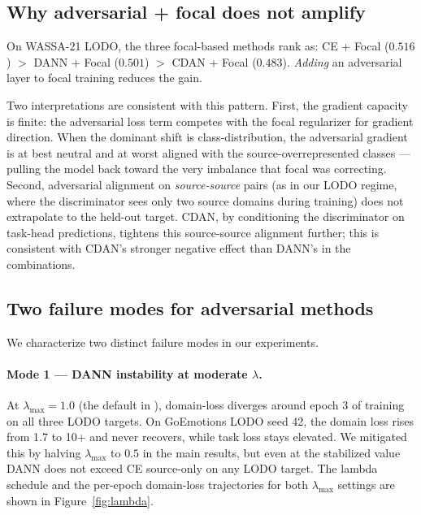 \subsection{Why adversarial + focal does not amplify}
\label{sec:discussion:combinations}

On WASSA-21 LODO, the three focal-based methods rank as: CE + Focal
($0.516$) $>$ DANN + Focal ($0.501$) $>$ CDAN + Focal ($0.483$).
\emph{Adding} an adversarial layer to focal training reduces the
gain.

Two interpretations are consistent with this pattern. First, the
gradient capacity is finite: the adversarial loss term competes with
the focal regularizer for gradient direction. When the dominant
shift is class-distribution, the adversarial gradient is at best
neutral and at worst aligned with the source-overrepresented
classes — pulling the model back toward the very imbalance that
focal was correcting. Second, adversarial alignment on
\emph{source-source} pairs (as in our LODO regime, where the
discriminator sees only two source domains during training) does not
extrapolate to the held-out target. CDAN, by conditioning the
discriminator on task-head predictions, tightens this source-source
alignment further; this is consistent with CDAN's stronger negative
effect than DANN's in the combinations.

\subsection{Two failure modes for adversarial methods}
\label{sec:discussion:failure}

We characterize two distinct failure modes in our experiments.

\paragraph{Mode 1 — DANN instability at moderate $\lambda$.}
At $\lambda_{\max}=1.0$ (the default in \citet{ganin2016dann}),
domain-loss diverges around epoch 3 of training on all three LODO
targets. On GoEmotions LODO seed 42, the domain loss rises from 1.7
to 10+ and never recovers, while task loss
stays elevated. We mitigated this by halving $\lambda_{\max}$ to
$0.5$ in the main results, but even at the stabilized value DANN
does not exceed CE source-only on any LODO target. The lambda
schedule and the per-epoch domain-loss trajectories for both
$\lambda_{\max}$ settings are shown in Figure~\ref{fig:lambda}.

